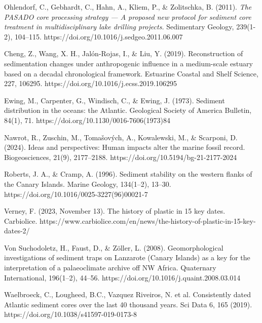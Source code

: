 \documentclass[twocolumn,a4paper,aps,amsmath,amssymb,floatfix,superscriptaddress]{revtex4-2}
\begin{document}
\begin{thebibliography}{10}
		Ohlendorf, C., Gebhardt, C., Hahn, A., Kliem, P., \& Zolitschka, B. (2011). \textit{The PASADO core processing strategy — A proposed new protocol for sediment core treatment in multidisciplinary lake drilling projects.} Sedimentary Geology, 239(1-2), 104–115. https://doi.org/10.1016/j.sedgeo.2011.06.007
		
		Cheng, Z., Wang, X. H., Jalón-Rojas, I., \& Liu, Y. (2019). Reconstruction of sedimentation changes under anthropogenic influence in a medium-scale estuary based on a decadal chronological framework. Estuarine Coastal and Shelf Science, 227, 106295. https://doi.org/10.1016/j.ecss.2019.106295
		
		 Ewing, M., Carpenter, G., Windisch, C., \& Ewing, J. (1973). Sediment distribution in the oceans: the Atlantic. Geological Society of America Bulletin, 84(1), 71. https://doi.org/10.1130/0016-7606(1973)84
		
		Nawrot, R., Zuschin, M., Tomašových, A., Kowalewski, M., \& Scarponi, D. (2024). Ideas and perspectives: Human impacts alter the marine fossil record. Biogeosciences, 21(9), 2177–2188. https://doi.org/10.5194/bg-21-2177-2024
		
		 Roberts, J. A., \& Cramp, A. (1996). Sediment stability on the western flanks of the Canary Islands. Marine Geology, 134(1–2), 13–30. https://doi.org/10.1016/0025-3227(96)00021-7
		
		 Verney, F. (2023, November 13). The history of plastic in 15 key dates. Carbiolice. https://www.carbiolice.com/en/news/the-history-of-plastic-in-15-key-dates-2/
		
		 Von Suchodoletz, H., Faust, D., \& Zöller, L. (2008). Geomorphological investigations of sediment traps on Lanzarote (Canary Islands) as a key for the interpretation of a palaeoclimate archive off NW Africa. Quaternary International, 196(1–2), 44–56. https://doi.org/10.1016/j.quaint.2008.03.014
		
		Waelbroeck, C., Lougheed, B.C., Vazquez Riveiros, N. et al. Consistently dated Atlantic sediment cores over the last 40 thousand years. Sci Data 6, 165 (2019). https://doi.org/10.1038/s41597-019-0173-8
	\end{thebibliography}
	
\end{document}

